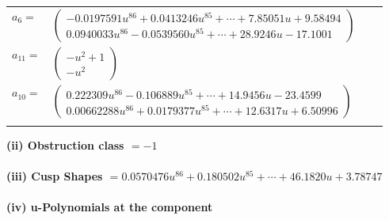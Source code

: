 \documentclass[1p]{elsarticle_modified}
\theoremstyle{definition}
\begin{document}
\begin{tabular}{m{7pt} m{180pt} m{7pt} m{180pt} }
\flushright $a_{6}=$&$\begin{pmatrix}-0.0197591 u^{86}+0.0413246 u^{85}+\cdots+7.85051 u+9.58494\\0.0940033 u^{86}-0.0539560 u^{85}+\cdots+28.9246 u-17.1001\end{pmatrix}$ \\
\flushright $a_{11}=$&$\begin{pmatrix}- u^2+1\\- u^2\end{pmatrix}$ \\
\flushright $a_{10}=$&$\begin{pmatrix}0.222309 u^{86}-0.106889 u^{85}+\cdots+14.9456 u-23.4599\\0.00662288 u^{86}+0.0179377 u^{85}+\cdots+12.6317 u+6.50996\end{pmatrix}$\\&\end{tabular}
\flushleft \textbf{(ii) Obstruction class $= -1$}\\~\\
\flushleft \textbf{(iii) Cusp Shapes $= 0.0570476 u^{86}+0.180502 u^{85}+\cdots+46.1820 u+3.78747$}\\~\\
\newpage\renewcommand{\arraystretch}{1}
\flushleft \textbf{(iv) u-Polynomials at the component}\newline \\
\end{document}
